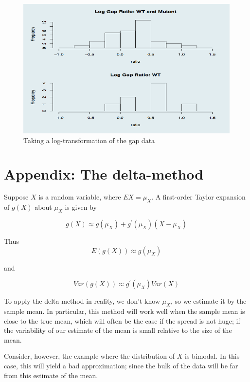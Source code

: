 \begin{figure}[H]
\begin{center}
\includegraphics[scale=0.5]{gap-log.png}
\end{center}
\caption{Taking a log-transformation of the gap data}
\label{fig:log_kernel2}
\end{figure}




\section{Appendix: The delta-method}

Suppose $X$ is a random variable, where $EX = \mu_X$. A first-order Taylor expansion of $g(X)$ about $\mu_X$ is given by

$$g(X) \approx g(\mu_X) + g^\prime(\mu_X)(X - \mu_X)$$

Thus
$$E(g(X)) \approx g(\mu_X)$$

and

$$Var(g(X)) \approx g^\prime(\mu_X)Var(X)$$


To apply the delta method in reality, we don't know $\mu_X$, so we estimate it by the sample mean. In particular, this method will work well when the sample mean is close to the true mean, which will often be the case if the spread is not huge; if the variability of our estimate of the mean is small relative to the size of the mean. 

Consider, however, the example where the distribution of $X$ is bimodal. In this case, this will yield a bad approximation; since the bulk of the data will be far from this estimate of the mean.